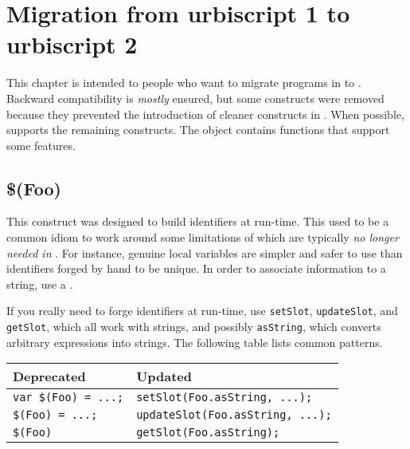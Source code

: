
\chapter{Migration from urbiscript 1 to urbiscript 2}
\label{sec:k1}

This chapter is intended to people who want to migrate programs in  to .  Backward compatibility is \emph{mostly} ensured, but some
 constructs were removed because they prevented the introduction
of cleaner constructs in .  When possible,  supports the
remaining  constructs.  The  object contains
functions that support some  features.


\section{\$(Foo)}
\label{sec:k122:dollar}

This construct was designed to build identifiers at run-time.  This
used to be a common idiom to work around some limitations of 
which are typically \emph{no longer needed in }.  For instance,
genuine local variables are simpler and safer to use than identifiers
forged by hand to be unique.  In order to associate information to a
string, use a .

If you really need to forge identifiers at run-time, use
\lstinline{setSlot}, \lstinline{updateSlot}, and \lstinline{getSlot},
which all work with strings, and possibly \lstinline{asString}, which
converts arbitrary expressions into strings.  The
following table lists common patterns.

\begin{center}
  \begin{tabular}{|l|l|}
    \hline
    \textbf{Deprecated} & \textbf{Updated}  \\
    \hline
    \lstinline|var $(Foo) = ...;| & \lstinline|setSlot(Foo.asString, ...);|   \\
    \lstinline|$(Foo) = ...;|     & \lstinline|updateSlot(Foo.asString, ...);|\\
    \lstinline|$(Foo)|            & \lstinline|getSlot(Foo.asString);|\\
    \hline
  \end{tabular}%
\end{center}

